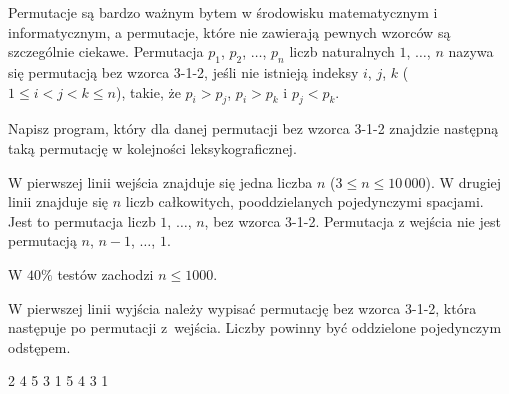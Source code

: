 

\usepackage[utf8]{inputenc}
\usepackage[T1]{fontenc}
\usepackage[polish]{babel}
\usepackage{polski}





Permutacje są bardzo ważnym bytem w środowisku matematycznym i informatycznym,
	a permutacje, które nie zawierają pewnych wzorców są szczególnie ciekawe.
Permutacja $p_1$, $p_2$, $\ldots$, $p_n$ liczb naturalnych $1$, $\ldots$, $n$
	nazywa się permutacją bez wzorca 3-1-2, jeśli nie istnieją indeksy $i$, $j$, $k$ ($1 \le i < j < k \le n$),
	takie, że $p_i > p_j$, $p_i > p_k$ i $p_j < p_k$.


Napisz program, który dla danej permutacji bez wzorca 3-1-2 znajdzie następną
	taką permutację w kolejności leksykograficznej.


W pierwszej linii wejścia znajduje się jedna liczba $n$ ($3 \le n \le 10\,000$).
W drugiej linii znajduje się $n$ liczb całkowitych, pooddzielanych pojedynczymi spacjami.
Jest to permutacja liczb $1$, $\ldots$, $n$, bez wzorca 3-1-2.
Permutacja z wejścia nie jest permutacją $n$, $n-1$, $\ldots$, $1$.

W $40\%$ testów zachodzi $n \le 1000$.


W pierwszej linii wyjścia należy wypisać permutację bez wzorca 3-1-2, która następuje po permutacji z~wejścia.
Liczby powinny być oddzielone pojedynczym odstępem.


2 4 5 3 1
 5 4 3 1
\sampleEND


